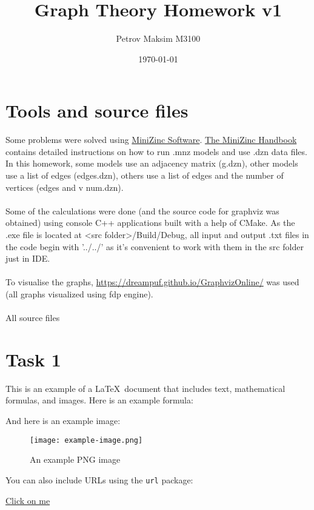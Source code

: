 \documentclass{article}
\title{\fontfamily{bch}\selectfont\Huge Graph Theory Homework v1}
\author{\Large Petrov Maksim M3100}
\date{\Large \today}
\begin{document}
	\fontsize{14pt}{16pt}\selectfont
	\maketitle
	
	\section*{Tools and source files}
	Some problems were solved using \href{https://www.minizinc.org/software.html}{MiniZinc Software}. \href{https://www.minizinc.org/doc-2.7.0/en/index.html}{The MiniZinc Handbook} contains detailed instructions on how to run .mnz models and use .dzn data files. In this homework, some models use an adjacency matrix (g.dzn), other models use a list of edges (edges.dzn), others use a list of edges and the number of vertices (edges and v num.dzn). \\\\
	Some of the calculations were done (and the source code for graphviz was obtained) using console C++ applications built with a help of CMake. As the .exe file is located at {\textless}src folder{\textgreater}/Build/Debug, all input and output .txt files in the code begin with '../../' as it's convenient to work with them in the src folder just in IDE.\\\\
	To visualise the graphs, \url{https://dreampuf.github.io/GraphvizOnline/} was used (all graphs visualized using fdp engine).\\\\
	All source files
	\section*{Task 1}
	
	This is an example of a \LaTeX\  document that includes text, mathematical formulas, and images. Here is an example formula:
	
	And here is an example image:
	
	\begin{figure}[h]
		\centering
		\texttt{[image: example-image.png]}
		\caption{An example PNG image}
		\label{fig:example-image}
	\end{figure}
	
	You can also include URLs using the \texttt{url} package:
	
	\href{https://www.example.com}{Click on me}
	
\end{document}
